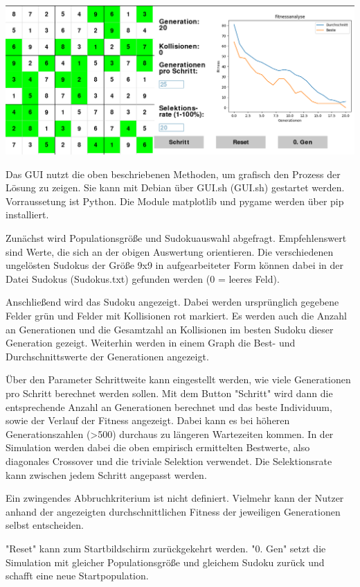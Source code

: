 \includegraphics[width=\textwidth]{../Pictures/GUI.png}

\noindent Das GUI nutzt die oben beschriebenen Methoden, um grafisch den Prozess der Lösung zu zeigen. 
Sie kann mit Debian über GUI.sh (GUI.sh) gestartet werden.
Vorraussetung ist Python. Die Module matplotlib und pygame werden über pip installiert.

\noindent Zunächst wird Populationsgröße und Sudokuauswahl abgefragt. 
Empfehlenswert sind Werte, die sich an der obigen Auswertung orientieren.
Die verschiedenen ungelösten Sudokus der Größe 9x9 in aufgearbeiteter Form können dabei in der Datei Sudokus (Sudokus.txt) gefunden werden (0 = leeres Feld).

\noindent Anschließend wird das Sudoku angezeigt. Dabei werden ursprünglich gegebene Felder grün und Felder mit Kollisionen rot markiert. 
Es werden auch die Anzahl an Generationen und die Gesamtzahl an Kollisionen im besten Sudoku dieser Generation gezeigt. Weiterhin werden in einem Graph die Best- und Durchschnittswerte der Generationen angezeigt.

\noindent Über den Parameter Schrittweite kann eingestellt werden, wie viele Generationen pro Schritt berechnet werden sollen. 
Mit dem Button "{}Schritt{}"{} wird dann die entsprechende Anzahl an Generationen berechnet und das beste Individuum, sowie der Verlauf der Fitness angezeigt. Dabei kann es bei höheren Generationszahlen (>500) durchaus zu längeren Wartezeiten kommen.
\newpage
\noindent In der Simulation werden dabei die oben empirisch ermittelten Bestwerte, also diagonales Crossover und die triviale Selektion verwendet. Die Selektionsrate kann zwischen jedem Schritt angepasst werden.

\noindent Ein zwingendes Abbruchkriterium ist nicht definiert. Vielmehr kann der Nutzer anhand der angezeigten durchschnittlichen Fitness der jeweiligen Generationen selbst entscheiden.

 "Reset" kann zum Startbildschirm zurückgekehrt werden.
"{}0. Gen{}"{} setzt die Simulation mit gleicher Populationsgröße und gleichem Sudoku zurück und schafft eine neue Startpopulation.
